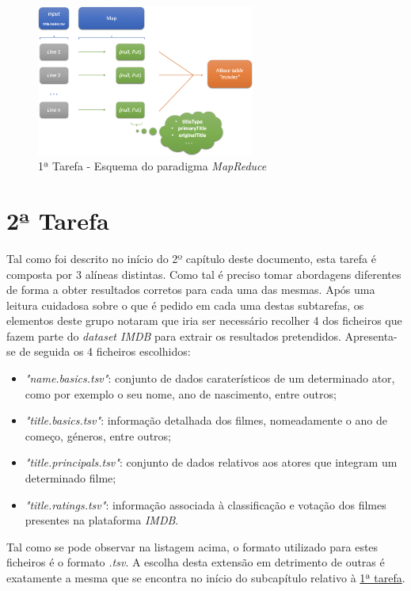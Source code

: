 \documentclass[a4paper]{report}
\begin{document}
{		\begin{figure}[H]
			\centering
			\includegraphics[width=0.64\textwidth]{Imagens/1ª Tarefa - Esquema MapReduce.png}
			\caption{1ª Tarefa - Esquema do paradigma \textit{MapReduce}}
			\label{fig:12}
		\end{figure}
		
		
		\section{2ª Tarefa} \label{sec:Task2}
		Tal como foi descrito no início do 2º capítulo deste documento, esta tarefa é composta por 3 alíneas distintas. Como tal é preciso tomar abordagens diferentes de forma a obter resultados corretos para cada uma das mesmas. 
		Após uma leitura cuidadosa sobre o que é pedido em cada uma destas subtarefas, os elementos deste grupo notaram que iria ser necessário recolher 4 dos ficheiros que fazem parte do \textit{dataset IMDB} para extrair os resultados pretendidos.
		Apresenta-se de seguida os 4 ficheiros escolhidos:
		\begin{itemize}
			\item \textit{"name.basics.tsv"}: conjunto de dados caraterísticos de um determinado ator, como por exemplo o seu nome, ano de nascimento, entre outros;
			\item \textit{"title.basics.tsv"}: informação detalhada dos filmes, nomeadamente o ano de começo, géneros, entre outros;
			\item \textit{"title.principals.tsv"}: conjunto de dados relativos aos atores que integram um determinado filme;
			\item \textit{"title.ratings.tsv"}: informação associada à classificação e votação dos filmes presentes na plataforma \textit{IMDB}.
		\end{itemize}
		
		Tal como se pode observar na listagem acima, o formato utilizado para estes ficheiros é o formato \textit{.tsv}. A escolha desta extensão em detrimento de outras é exatamente a mesma que se encontra no início do subcapítulo relativo à \hyperref[sec:Task1]{1ª tarefa}.
		
}
\end{document}
